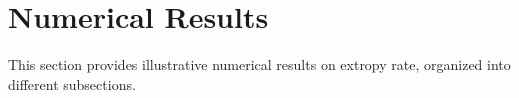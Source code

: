 \documentclass[pdflatex]{sn-jnl}%
\theoremstyle{thmstyleone}
\theoremstyle{thmstyletwo}%
\theoremstyle{thmstylethree}%
\begin{document}

\section{Numerical Results}\label{numericalresults}
This section provides illustrative numerical results on extropy rate, organized into different subsections.
\end{document}
